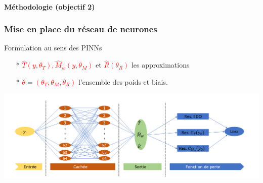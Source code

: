 \documentclass[handout]{beamer}
\newtheorem{pbm et hypo}[thm]{Problématique et hypothèses}
\begin{document}
	\begin{frame}
		\framesubtitle{\textbf{Méthodologie (objectif 2)}}
		\begin{flushright}
			\frametitle{\textbf{Mise en place du réseau de neurones}}
		\end{flushright}
	\begin{block}{Formulation au sens des PINNs}\pause
	\begin{itemize}
		\item[*] 	\textcolor{red}{$ \hat{T}(y, \theta_T), \hat{M}_w(y, \theta_M)$} et \textcolor{red}{$\hat{R}( \theta_R)$} les approximations %
		\item[*] \textcolor{red}{$\theta = (\theta_T, \theta_M, \theta_R) $} l'ensemble des poids et biais.
	\end{itemize}
\end{block}
	\vspace{0.2cm}
	\begin{center}

	\includegraphics[width=0.7\linewidth]{pp6}
\end{center}
	\end{frame}
	
\end{document}
